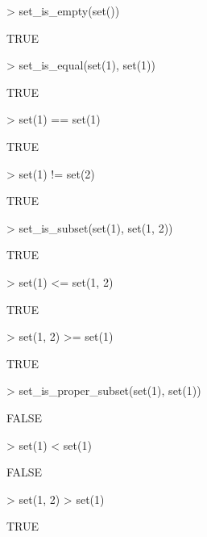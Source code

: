 \documentclass[fleqn]{article}
\begin{document}
\begin{Schunk}
\begin{Sinput}
> set_is_empty(set())
\end{Sinput}
\begin{Soutput}
[1] TRUE
\end{Soutput}
\begin{Sinput}
> set_is_equal(set(1), set(1))
\end{Sinput}
\begin{Soutput}
[1] TRUE
\end{Soutput}
\begin{Sinput}
> set(1) == set(1)
\end{Sinput}
\begin{Soutput}
[1] TRUE
\end{Soutput}
\begin{Sinput}
> set(1) != set(2)
\end{Sinput}
\begin{Soutput}
[1] TRUE
\end{Soutput}
\begin{Sinput}
> set_is_subset(set(1), set(1, 2))
\end{Sinput}
\begin{Soutput}
[1] TRUE
\end{Soutput}
\begin{Sinput}
> set(1) <= set(1, 2)
\end{Sinput}
\begin{Soutput}
[1] TRUE
\end{Soutput}
\begin{Sinput}
> set(1, 2) >= set(1)
\end{Sinput}
\begin{Soutput}
[1] TRUE
\end{Soutput}
\begin{Sinput}
> set_is_proper_subset(set(1), set(1))
\end{Sinput}
\begin{Soutput}
[1] FALSE
\end{Soutput}
\begin{Sinput}
> set(1) < set(1)
\end{Sinput}
\begin{Soutput}
[1] FALSE
\end{Soutput}
\begin{Sinput}
> set(1, 2) > set(1)
\end{Sinput}
\begin{Soutput}
[1] TRUE
\end{Soutput}
\begin{Sinput}

\end{Sinput}
\end{Schunk}
\end{document}
